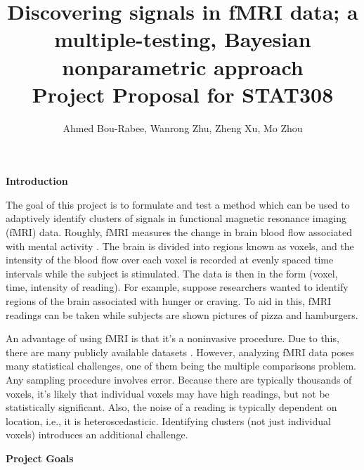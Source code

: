 \documentclass[12pt]{article}
\title{Discovering signals in fMRI data; 
a multiple-testing, Bayesian nonparametric approach   \\ \large{Project Proposal for STAT308}}
\author{Ahmed Bou-Rabee, Wanrong Zhu, Zheng Xu, Mo Zhou}
\begin{document}
\maketitle

{\bf Introduction } 

The goal of this project is to formulate and test a method which can be used to adaptively identify 
clusters of signals in functional magnetic resonance imaging (fMRI) data. 
Roughly, fMRI measures the change in brain blood flow associated 
with mental activity \cite{huettel2004functional}. The brain is divided into regions known as voxels, and the intensity 
of the blood flow over each voxel is recorded at evenly spaced time intervals while the subject is stimulated. The data is then in the form 
(voxel, time, intensity of reading). For example, suppose researchers wanted to identify regions 
of the brain associated with hunger or craving. To aid in this, fMRI readings can be taken while subjects are shown pictures of pizza and hamburgers. 

An advantage of using fMRI is that it's a noninvasive procedure.  Due to this, there are many publicly available datasets \cite{poldrack2013toward}.
However, analyzing fMRI data poses many statistical challenges, one of them being the multiple comparisons problem. 
 Any sampling procedure involves error.  Because there are typically thousands of voxels, it's likely that individual voxels 
 may have high readings, but not be statistically significant.  Also, the noise of a reading is typically dependent on location, i.e., it is heteroscedasticic.
 Identifying clusters (not just individual voxels) introduces an additional challenge. 

 
\vspace{1em}

{\bf Project Goals } 
\vspace{0.5em} 
\end{document}
